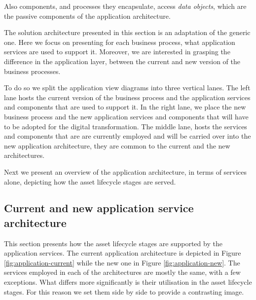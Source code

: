 	Also components, and processes they encapsulate, access \textit{data objects}, which are the passive components of the application architecture.

	The solution architecture presented in this section is an adaptation of the generic one. Here we focus on presenting for each business process, what application services are used to support it. Moreover, we are interested in grasping the difference in the application layer, between the current and new version of the business processes. 
	
	To do so we split the application view diagrams into three vertical lanes. The left lane hosts the current version of the business process and the application services and components that are used to support it. In the right lane, we place the new business process and the new application services and components that will have to be adopted for the digital transformation. The middle lane, hosts the services and components that are are currently employed and will be carried over into the new application architecture, they are common to the current and the new architectures.

	Next we present an overview of the application architecture, in terms of services alone, depicting how the asset lifecycle stages are served.
	
	\subsection{Current and new application service architecture}
	\label{sec:application-current}
	
	This section presents how the asset lifecycle stages are supported by the application services. The current application architecture is depicted in Figure \ref{fig:application-current} while the new one in Figure \ref{fig:application-new}. The services employed in each of the architectures are mostly the same, with a few exceptions. What differs more significantly is their utilisation in the asset lifecycle stages. For this reason we set them side by side to provide a contrasting image. 
	
